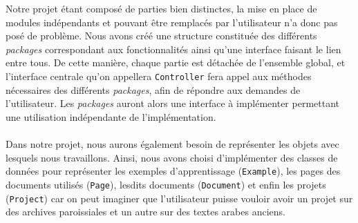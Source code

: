 Notre projet étant composé de parties bien distinctes, la mise en place de modules indépendants et pouvant être remplacés par l'utilisateur n'a donc pas posé de problème. Nous avons créé une structure constituée des différents \textit{packages} correspondant aux fonctionnalités ainsi qu'une interface faisant le lien entre tous. De cette manière, chaque partie est détachée de l'ensemble global, et l'interface centrale qu'on appellera \texttt{Controller} fera appel aux méthodes nécessaires des différents \textit{packages}, afin de répondre aux demandes de l'utilisateur. Les \textit{packages} auront alors une interface à implémenter permettant une utilisation indépendante de l'implémentation.
\newpage
{}

\paragraph{}
Dans notre projet, nous aurons également besoin de représenter les objets avec lesquels nous travaillons. Ainsi, nous avons choisi d'implémenter des classes de données pour représenter les exemples d'apprentissage (\texttt{Example}), les pages des documents utilisés (\texttt{Page}), lesdits documents (\texttt{Document}) et enfin les projets (\texttt{Project}) car on peut imaginer que l'utilisateur puisse vouloir avoir un projet sur des archives paroissiales et un autre sur des textes arabes anciens.

